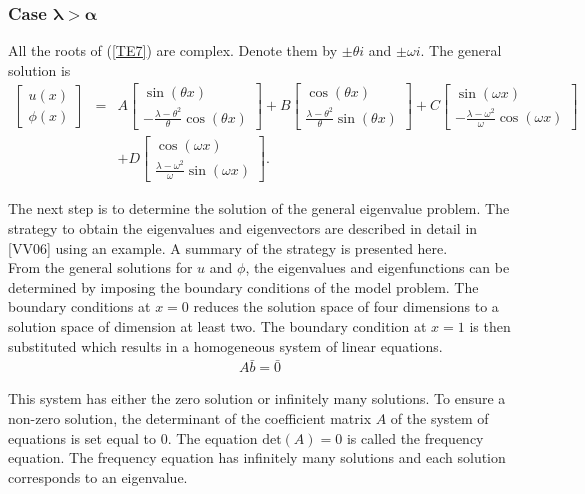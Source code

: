 \documentclass[../../main.tex]{subfiles}
\begin{document}
\subsubsection{Case $\boldsymbol{\lambda>\alpha}$}

All the roots of (\ref{TE7}) are complex. Denote them by $\pm \theta i$ and $\pm \omega i$. The general solution is
\begin{eqnarray*}
\begin{bmatrix}
u(x)\\ \phi(x)
\end{bmatrix}
&=&
A
\begin{bmatrix}
\sin (\theta  x) \\-\frac{\lambda-\theta^{2}}{\theta}\cos (\theta x)
\end{bmatrix}
+
B
\begin{bmatrix}
\cos (\theta x) \\ \frac{\lambda-\theta^{2}}{\theta}\sin (\theta x)
\end{bmatrix}
+
C
\begin{bmatrix}
\sin (\omega x) \\ -\frac{\lambda-\omega^{2}}{\omega}\cos (\omega x)
\end{bmatrix}\\
&&
+
D
\begin{bmatrix}
\cos (\omega x) \\ \frac{\lambda-\omega^{2}}{\omega}\sin (\omega x)
\end{bmatrix}.\label{T10}
\end{eqnarray*}

The next step is to determine the solution of the general eigenvalue problem. The strategy to obtain the eigenvalues and eigenvectors are described in detail in [VV06] using an example. A summary of the strategy is presented here.\\

From the general solutions for $u$ and $\phi$, the eigenvalues and eigenfunctions can be determined by imposing the boundary conditions of the model problem. The boundary conditions at $x=0$ reduces the solution space of four dimensions to a solution space of dimension at least two. The boundary condition at $x=1$ is then substituted which results in a homogeneous system of linear equations.
\begin{eqnarray*}
A \bar{b} = \bar{0}
\end{eqnarray*}

 This system has either the zero solution or infinitely many solutions. To ensure a non-zero solution, the determinant of the coefficient matrix $A$ of the system of equations is set equal to 0. The equation $\textrm{det}(A) = 0$ is called the frequency equation. The frequency equation has infinitely many solutions and each solution corresponds to an eigenvalue.\\
 
\end{document}
